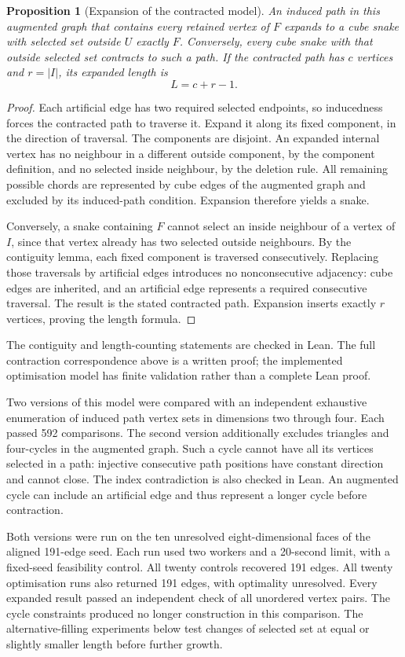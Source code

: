 \documentclass[11pt,a4paper]{article}
\newtheorem{proposition}[theorem]{Proposition}
\theoremstyle{definition}
\theoremstyle{remark}
\begin{document}
\begin{proposition}[Expansion of the contracted model]
An induced path in this augmented graph that contains every retained vertex of $F$ expands to a cube snake with selected set outside $U$ exactly $F$. Conversely, every cube snake with that outside selected set contracts to such a path. If the contracted path has $c$ vertices and $r=|I|$, its expanded length is
\[
L=c+r-1.
\]
\end{proposition}
\begin{proof}
Each artificial edge has two required selected endpoints, so inducedness forces the contracted path to traverse it. Expand it along its fixed component, in the direction of traversal. The components are disjoint. An expanded internal vertex has no neighbour in a different outside component, by the component definition, and no selected inside neighbour, by the deletion rule. All remaining possible chords are represented by cube edges of the augmented graph and excluded by its induced-path condition. Expansion therefore yields a snake.

Conversely, a snake containing $F$ cannot select an inside neighbour of a vertex of $I$, since that vertex already has two selected outside neighbours. By the contiguity lemma, each fixed component is traversed consecutively. Replacing those traversals by artificial edges introduces no nonconsecutive adjacency: cube edges are inherited, and an artificial edge represents a required consecutive traversal. The result is the stated contracted path. Expansion inserts exactly $r$ vertices, proving the length formula.
\end{proof}

The contiguity and length-counting statements are checked in Lean. The full contraction correspondence above is a written proof; the implemented optimisation model has finite validation rather than a complete Lean proof.

Two versions of this model were compared with an independent exhaustive enumeration of induced path vertex sets in dimensions two through four. Each passed 592 comparisons. The second version additionally excludes triangles and four-cycles in the augmented graph. Such a cycle cannot have all its vertices selected in a path: injective consecutive path positions have constant direction and cannot close. The index contradiction is also checked in Lean. An augmented cycle can include an artificial edge and thus represent a longer cycle before contraction.

Both versions were run on the ten unresolved eight-dimensional faces of the aligned 191-edge seed. Each run used two workers and a 20-second limit, with a fixed-seed feasibility control. All twenty controls recovered 191 edges. All twenty optimisation runs also returned 191 edges, with optimality unresolved. Every expanded result passed an independent check of all unordered vertex pairs. The cycle constraints produced no longer construction in this comparison. The alternative-filling experiments below test changes of selected set at equal or slightly smaller length before further growth.
\end{document}
